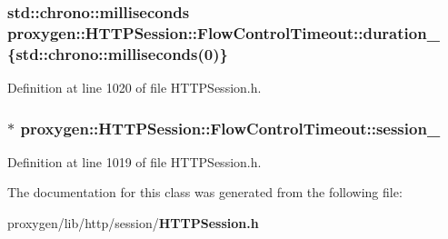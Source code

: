 \subsubsection[{duration\+\_\+}]{\setlength{\rightskip}{0pt plus 5cm}std\+::chrono\+::milliseconds proxygen\+::\+H\+T\+T\+P\+Session\+::\+Flow\+Control\+Timeout\+::duration\+\_\+ \{std\+::chrono\+::milliseconds(0)\}\hspace{0.3cm}{\ttfamily [private]}}\label{classproxygen_1_1HTTPSession_1_1FlowControlTimeout_a49f899bd769c1d7e2f2783ed6e1ae31b}


Definition at line 1020 of file H\+T\+T\+P\+Session.\+h.

\subsubsection[{session\+\_\+}]{$\ast$ proxygen\+::\+H\+T\+T\+P\+Session\+::\+Flow\+Control\+Timeout\+::session\+\_\+\hspace{0.3cm}{\ttfamily [private]}}\label{classproxygen_1_1HTTPSession_1_1FlowControlTimeout_a4aefa54a9c2d58221e0f9f5146b4394c}


Definition at line 1019 of file H\+T\+T\+P\+Session.\+h.



The documentation for this class was generated from the following file\+:\begin{DoxyCompactItemize}
\item 
proxygen/lib/http/session/{\bf H\+T\+T\+P\+Session.\+h}\end{DoxyCompactItemize}
